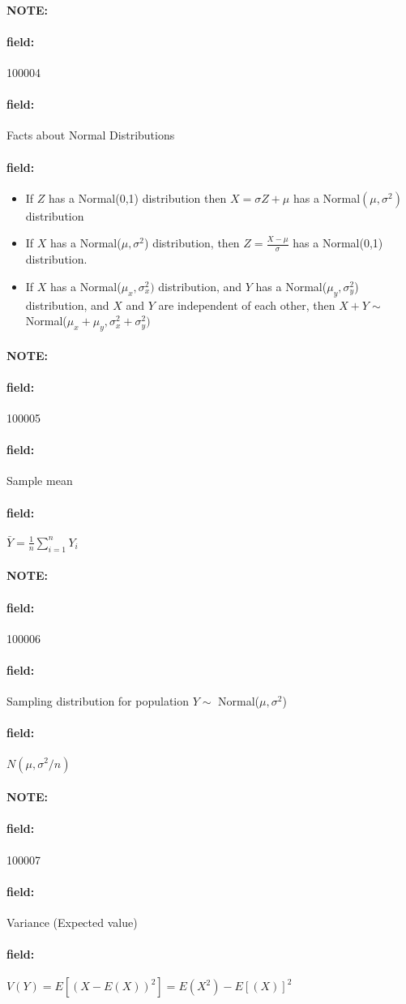 \documentclass[12pt]{article}
\newenvironment{note}{\paragraph{NOTE:}}{}
\newenvironment{field}{\paragraph{field:}}{}
\begin{document}
\begin{note} \begin{field} \tiny 100004 \end{field}
 \begin{field}
  Facts about Normal Distributions
 \end{field}
 \begin{field}
  \begin{itemize}
   \item If $Z$ has a Normal(0,1) distribution then $X = \sigma Z + \mu$ has a Normal$(\mu,\sigma^2)$ distribution
   \item If $X$ has a Normal($\mu,\sigma^2$) distribution, then $Z = \frac{X - \mu}{\sigma}$ has a Normal(0,1) distribution.
   \item If $X$ has a Normal($\mu_x,\sigma^2_x)$ distribution, and $Y$ has a Normal($\mu_y,\sigma_y^2$) distribution, and $X$ and $Y$ are independent of each other, then $X + Y \sim $ Normal($\mu_x + \mu_y, \sigma_x^2 + \sigma_y^2)$
  \end{itemize}
 \end{field}
\end{note}

\begin{note} \begin{field} \tiny 100005 \end{field}
 \begin{field}
  Sample mean
 \end{field}
 \begin{field}
  $\bar{Y} = \frac{1}{n}\sum_{i=1}^n Y_i$
 \end{field}
\end{note}

\begin{note} \begin{field} \tiny 100006 \end{field}
 \begin{field}
  Sampling distribution for population $Y \sim $ Normal($\mu,\sigma^2$)
 \end{field}
 \begin{field}
  $N(\mu,\sigma^2/n)$
 \end{field}
\end{note}

\begin{note} \begin{field} \tiny 100007 \end{field}
 \begin{field}
  Variance (Expected value)
 \end{field}
 \begin{field}
  $V(Y) = E[(X - E(X))^2] = E(X^2) - E[(X)]^2$
 \end{field}
\end{note}
\end{document}
